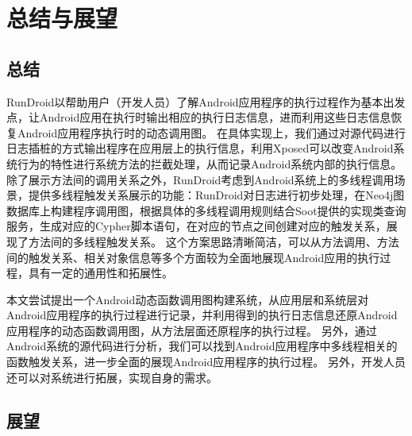 \chapter{总结与展望}
\label{chp:future}
\section{总结}



RunDroid以帮助用户（开发人员）了解Android应用程序的执行过程作为基本出发点，让Android应用在执行时输出相应的执行日志信息，进而利用这些日志信息恢复Android应用程序执行时的动态调用图。
在具体实现上，我们通过对源代码进行日志插桩的方式输出程序在应用层上的执行信息，利用Xposed可以改变Android系统行为的特性进行系统方法的拦截处理，从而记录Android系统内部的执行信息。
除了展示方法间的调用关系之外，RunDroid考虑到Android系统上的多线程调用场景，提供多线程触发关系展示的功能：RunDroid对日志进行初步处理，在Neo4j图数据库上构建程序调用图，根据具体的多线程调用规则结合Soot提供的实现类查询服务，生成对应的Cypher脚本语句，在对应的节点之间创建对应的触发关系，展现了方法间的多线程触发关系。
这个方案思路清晰简洁，可以从方法调用、方法间的触发关系、相关对象信息等多个方面较为全面地展现Android应用的执行过程，具有一定的通用性和拓展性。


本文尝试提出一个Android动态函数调用图构建系统，从应用层和系统层对Android应用程序的执行过程进行记录，并利用得到的执行日志信息还原Android应用程序的动态函数调用图，从方法层面还原程序的执行过程。
另外，通过Android系统的源代码进行分析，我们可以找到Android应用程序中多线程相关的函数触发关系，进一步全面的展现Android应用程序的执行过程。
另外，开发人员还可以对系统进行拓展，实现自身的需求。

\section{展望}

